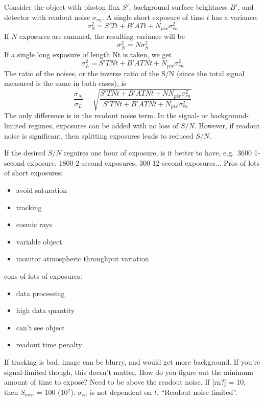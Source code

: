 \documentclass[12pt]{article}
\begin{document}
Consider the object with photon flux $S'$,
background surface brightness $B'$, and detector
with readout noise $\sigma_{rn}$. A single short exposure of
time $t$ has a variance:
    $$ \sigma_S^{2} = S'Tt + B'ATt + N_{pix}\sigma_{rn}^{2} $$
If $N$ exposures are summed, the resulting variance will be
    $$ \sigma_N^{2} = N\sigma_S^{2} $$
If a single long exposure of length Nt is taken, we get
    $$ \sigma_L^{2} = S'TNt + B'ATNt + N_{pix}\sigma_{rn}^{2} $$
The ratio of the noises, or the inverse ratio of the S/N (since the
total signal measured is the same in both cases), is
    $$ \frac{\sigma_N}{\sigma_L} = \sqrt{\frac
    {S'TNt + B'ATNt + NN_{pix}\sigma_{rn}^{2} }
    {S'TNt + B'ATNt + N_{pix}\sigma_{rn}^{2}}
    }$$
The only difference is in the readout noise term.
In the signal- or background-limited regimes, exposures can be added
with no loss of $S/N$. However, if readout noise is significant, then
splitting exposures leads to reduced $S/N$.

\textcolor{myBlue}{If the desired $S/N$ reguires one hour of exposure,
    is it better to have, e.g.\ 3600 1-second exposure, 1800 2-second
    exposures, 300 12-second exposures$\ldots$
    Pros of lots of short exposures:
    \begin{itemize}
        \item avoid saturation
        \item tracking
        \item cosmic rays
        \item variable object
        \item monitor atmospheric throughput variation
    \end{itemize}
    cons of lots of exposures:
    \begin{itemize}
        \item data processing
        \item high data quantity
        \item can't see object
        \item readout time penalty
    \end{itemize}
    If tracking is bad, image can be blurry, and would get more background.
    If you're signal-limited though, this doesn't matter.
    How do you figure out the minimum amount of time to expose?
    Need to be above the readout noise. If [rn?] = 10, then
    $S_{min}$ = 100 (10$^{2}$). $\sigma_{rn}$ is not dependent on $t$.
    ``Readout noise limited''.
}

\textcolor{om}{\emph{}}
\end{document}
